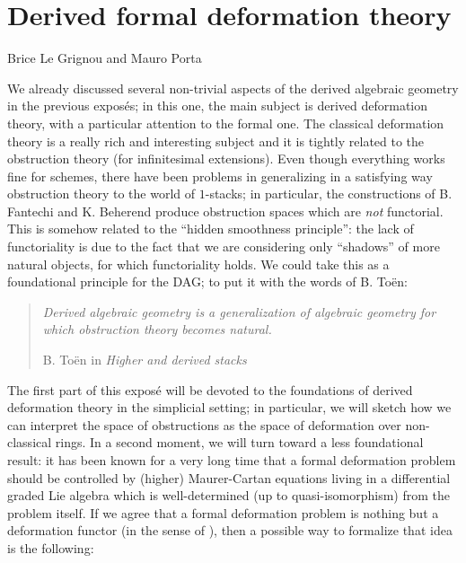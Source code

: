 \chapter{Derived formal deformation theory}
\begin{flushright}
  Brice Le Grignou and Mauro Porta
\end{flushright}

\begin{refsection}

We already discussed several non-trivial aspects of the derived algebraic geometry in the previous expos\'es; in this one, the main subject is derived deformation theory, with a particular attention to the formal one. The classical deformation theory is a really rich and interesting subject and it is tightly related to the obstruction theory (for infinitesimal extensions). Even though everything works fine for schemes, there have been problems in generalizing in a satisfying way obstruction theory to the world of $1$-stacks; in particular, the constructions of B. Fantechi and K. Beherend produce obstruction spaces which are \emph{not} functorial. This is somehow related to the ``hidden smoothness principle'': the lack of functoriality is due to the fact that we are considering only ``shadows'' of more natural objects, for which functoriality holds. We could take this as a foundational principle for the DAG; to put it with the words of B. To\"en:

\begin{quote}
\emph{Derived algebraic geometry is a generalization of algebraic geometry for which obstruction theory becomes natural.}
\begin{flushright}
B. To\"en in \emph{Higher and derived stacks}
\end{flushright}
\end{quote}

The first part of this expos\'e will be devoted to the foundations of derived deformation theory in the simplicial setting; in particular, we will sketch how we can interpret the space of obstructions as the space of deformation over non-classical rings. In a second moment, we will turn toward a less foundational result: it has been known for a very long time that a formal deformation problem should be controlled by (higher) Maurer-Cartan equations living in a differential graded Lie algebra which is well-determined (up to quasi-isomorphism) from the problem itself. If we agree that a formal deformation problem is nothing but a deformation functor (in the sense of \cite{manetti}), then a possible way to formalize that idea is the following:


\end{refsection}
